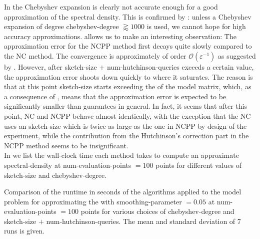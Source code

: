 In  the
Chebyshev expansion is clearly not accurate enough for a good approximation
of the spectral density. This is confirmed by :
unless a Chebyshev expansion of degree \gls{chebyshev-degree} $\gtrapprox 1000$ is used,
we cannot hope for high accuracy approximations.
 allows us to
make an interesting observation: The approximation error for the \gls{NCPP} method
first decays quite slowly compared to the \gls{NC} method.
The convergence is approximately of order $\mathcal{O}(\varepsilon^{-1})$
as suggested by .
However, after \gls{sketch-size} $+$ \gls{num-hutchinson-queries}
exceeds a certain value, the approximation error shoots down quickly to where it
saturates. The reason is that at this point \gls{sketch-size} starts exceeding
the  of the model matrix, which, as a consequence of
, means that the approximation error is
expected to be significantly smaller than 
guarantees in general. In fact, it seems that after this point, \gls{NC} and \gls{NCPP}
behave almost identically, with the exception that the \gls{NC} uses 
an \gls{sketch-size} which is twice as large as the one in \gls{NCPP} by design
of the experiment, while the contribution from the Hutchinson's correction part
in the \gls{NCPP} method  seems to be
insignificant.\\

In  we list the wall-clock time each method
takes to compute an approximate \gls{spectral-density} at \gls{num-evaluation-points} $=100$ points
for different values of \gls{sketch-size} and \gls{chebyshev-degree}.\\

\begin{table}[ht]
    \caption{Comparison of the runtime in seconds of the algorithms applied to the model problem
        for approximating the  with 
        \gls{smoothing-parameter} $=0.05$ at \gls{num-evaluation-points} $=100$
        points for various choices of \gls{chebyshev-degree} and \gls{sketch-size} $+$ \gls{num-hutchinson-queries}.
        The mean and standard deviation of 7 runs is given.}
    \label{tab:5-experiments-timing-DGC}
    
\end{table}

